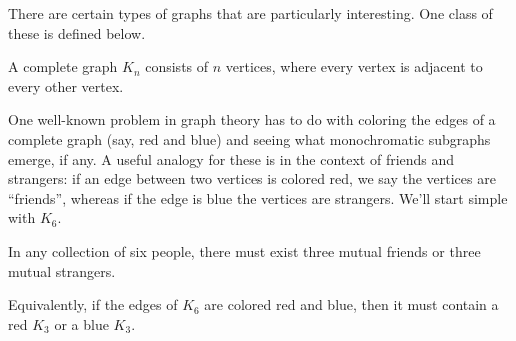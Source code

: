 \documentclass[../m55main.tex]{subfiles}
\begin{document}
There are certain types of graphs that are particularly interesting.
One class of these is defined below.

\begin{definition}
    A complete graph $K_n$ consists of $n$ vertices, where every vertex is adjacent to every other vertex.
\end{definition}

One well-known problem in graph theory has to do with coloring the edges of a complete graph (say, red and blue) and seeing what monochromatic subgraphs emerge, if any.
A useful analogy for these is in the context of friends and strangers: if an edge between two vertices is colored red, we say the vertices are ``friends'', whereas if the edge is blue the vertices are strangers.
We'll start simple with $K_6$.

\begin{theorem}
    In any collection of six people, there must exist three mutual friends or three mutual strangers.

    Equivalently, if the edges of $K_6$ are colored red and blue, then it must contain a red $K_3$ or a blue $K_3$.
\end{theorem}
\end{document}
